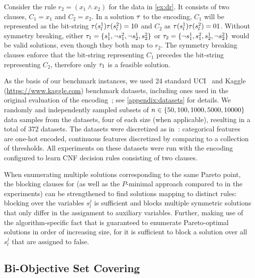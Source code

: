 \begin{example}
  Consider the rule $r_2 = (x_1 \land x_2)$ for the data in \cref{ex:dr}.
  It consists of two clauses, $C_1 = x_1$ and $C_2 = x_2$.
  In a solution $\tau$ to the encoding, $C_1$ will be represented as the bit-string $\tau(s_l^1)\tau(s_l^2)=10$ and $C_2$ as $\tau(s_l^1)\tau(s_l^2)=01$.
  Without symmetry breaking, either $\tau_1 = \{s_1^1, \lnot s_1^2, \lnot s_2^1, s_2^2\}$ or $\tau_2 = \{\lnot s_1^1, s_1^2, s_2^1, \lnot s_2^2\}$ would be valid solutions, even though they both map to $r_2$.
  The symmetry breaking clauses enforce that the bit-string representing $C_1$ precedes the bit-string representing $C_2$, therefore only $\tau_1$ is a feasible solution.
\end{example}

As the basis of our benchmark instances, we used 24 standard UCI~\autocite{UciMlr} and Kaggle ({\small\url{https://www.kaggle.com}}) benchmark datasets, including ones used in the original evaluation of the encoding~\autocite{DBLP:conf/cp/MaliotovM18}; see \cref{appendix:datasets} for details.
We randomly and independently sampled subsets of $n\in\{50,100,1000,5000,10000\}$ data samples from the datasets, four of each size (when applicable), resulting in a total of 372 datasets.
The datasets were discretized as in~\autocite{DBLP:conf/cp/MaliotovM18}:
categorical features are one-hot encoded, continuous features discretized by comparing to a collection of thresholds.
All experiments on these datasets were run with the encoding configured to learn CNF decision rules consisting of two clauses.

When enumerating multiple solutions corresponding to the same Pareto point, the blocking clauses for \algname{} (as well as the $P$-minimal approach compared to in the experiments) can be strengthened to find solutions mapping to distinct rules:
blocking over the variables $s_l^j$ is sufficient and blocks multiple symmetric solutions that only differ in the assignment to auxiliary variables.
Further, making use of the algorithm-specific fact that \algname{} is guaranteed to enumerate Pareto-optimal solutions in order of increasing size, for \algname{} it is sufficient to block a solution over all $s_l^j$ that are assigned to false.

\subsection{Bi-Objective Set Covering}


